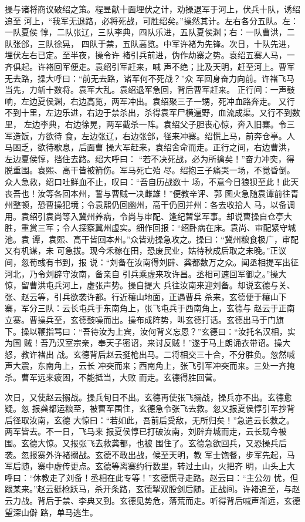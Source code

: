 操与诸将商议破绍之策。程昱献十面埋伏之计，劝操退军于河上，伏兵十队，诱绍追至
河上，“我军无退路，必将死战，可胜绍矣。”操然其计。左右各分五队。左：一队夏侯
惇，二队张辽，三队李典，四队乐进，五队夏侯渊；右：一队曹洪，二队张郃，三队徐晃，
四队于禁，五队高览。中军许褚为先锋。次日，十队先进，埋伏左右已定。至半夜，操令许
褚引兵前进，伪作劫寨之势。袁绍五寨人马，一齐俱起。许褚回军便走。袁绍引军赶来，喊
声不绝；比及天明，赶至河上。曹军无去路，操大呼曰：“前无去路，诸军何不死战？”众
军回身奋力向前。许褚飞马当先，力斩十数将。袁军大乱。袁绍退军急回，背后曹军赶来。
正行间：一声鼓响，左边夏侯渊，右边高览，两军冲出。袁绍聚三子一甥，死冲血路奔走。
又行不到十里，左边乐进，右边于禁杀出，杀得袁军尸横遍野，血流成渠。又行不到数里，
左边李典，右边徐晃，两军截杀一阵。袁绍父子胆丧心惊，奔入旧寨。令三军造饭，方欲待
食，左边张辽，右边张郃，径来冲寨。绍慌上马，前奔仓亭。人马困乏，欲待歇息，后面曹
操大军赶来，袁绍舍命而走。正行之间，右边曹洪，左边夏侯惇，挡住去路。绍大呼曰：
“若不决死战，必为所擒矣！”奋力冲突，得脱重围。袁熙、高干皆被箭伤。军马死亡殆
尽。绍抱三子痛哭一场，不觉昏倒。众人急救，绍口吐鲜血不止，叹曰：“吾自历战数十
场，不意今日狼狈至此！此天丧吾也！汝等各回本州，誓与曹贼一决雌雄！”便教辛评、郭
图火急随袁谭前往青州整顿，恐曹操犯境；令袁熙仍回幽州，高干仍回并州：各去收拾人
马，以备调用。袁绍引袁尚等入冀州养病，令尚与审配、逢纪暂掌军事。却说曹操自仓亭大
胜，重赏三军；令人探察冀州虚实。细作回报：“绍卧病在床。袁尚、审配紧守城池。袁
谭，袁熙、高干皆回本州。”众皆劝操急攻之。操曰：“冀州粮食极广，审配又有机谋，未
可急拔。现今禾稼在田，恐废民业，姑待秋成后取之未晚。”正议间，忽荀彧有书到，报
说：“刘备在汝南得刘辟、龚都数万之众。闻丞相提军出征河北，乃令刘辟守汝南，备亲自
引兵乘虚来攻许昌。丞相可速回军御之。”操大惊，留曹洪屯兵河上，虚张声势。操自提大
兵往汝南来迎刘备。却说玄德与关、张、赵云等，引兵欲袭许都。行近穰山地面，正遇曹兵
杀来，玄德便于穰山下寨，军分三队：云长屯兵于东南角上，张飞屯兵于西南角上，玄德与
赵云于正南立寨。曹操兵至，玄德鼓噪而出。操布成阵势，叫玄德打话。玄德出马于门旗
下。操以鞭指骂曰：“吾待汝为上宾，汝何背义忘恩？”玄德曰：“汝托名汉相，实为国
贼！吾乃汉室宗亲，奉天子密诏，来讨反贼！”遂于马上朗诵衣带诏。操大怒，教许褚出
战。玄德背后赵云挺枪出马。二将相交三十合，不分胜负。忽然喊声大震，东南角上，云长
冲突而来；西南角上，张飞引军冲突而来。三处一齐掩杀。曹军远来疲困，不能抵当，大败
而走。玄德得胜回营。

次日，又使赵云搦战。操兵旬日不出。玄德再使张飞搦战，操兵亦不出。玄德愈疑。忽
报龚都运粮至，被曹军围住，玄德急令张飞去救。忽又报夏侯惇引军抄背后径取汝南，玄德
大惊曰：“若如此，吾前后受敌，无所归矣！”急遣云长救之。两军皆去。不一日，飞马来
报夏侯惇已打破汝南，刘辟弃城而走，云长现今被围。玄德大惊。又报张飞去救龚都，也被
围住了。玄德急欲回兵，又恐操兵后袭。忽报寨外许褚搦战。玄德不敢出战，候至天明，教
军士饱餐，步军先起，马军后随，寨中虚传更点。玄德等离寨约行数里，转过土山，火把齐
明，山头上大呼曰：“休教走了刘备！丞相在此专等！”玄德慌寻走路。赵云曰：“主公勿
忧，但跟某来。”赵云挺枪跃马，杀开条路，玄德掣双股剑后随。正战间。许褚追至，与赵
云力战。背后于禁、李典又到。玄德见势危，落荒而走。听得背后喊声渐远，玄德望深山僻
路，单马逃生。


